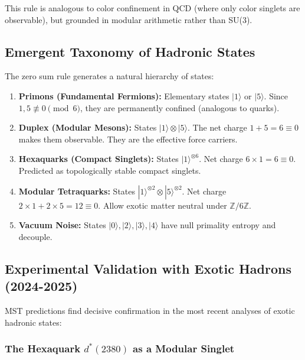\documentclass[11pt, a4paper]{article}
\theoremstyle{plain}
\theoremstyle{definition}
\newcommand{\Zmod}{\mathbb{Z}/6\mathbb{Z}}
\begin{document}
This rule is analogous to color confinement in QCD (where only color singlets are observable), but grounded in modular arithmetic rather than SU(3).

\subsection{Emergent Taxonomy of Hadronic States}

The zero sum rule generates a natural hierarchy of states:

\begin{enumerate}
    \item \textbf{Primons (Fundamental Fermions):} Elementary states $|1\rangle$ or $|5\rangle$. Since $1,5 \not\equiv 0 \pmod{6}$, they are permanently confined (analogous to quarks).
    
    \item \textbf{Duplex (Modular Mesons):} States $|1\rangle \otimes |5\rangle$. The net charge $1+5=6 \equiv 0$ makes them observable. They are the effective force carriers.
    
    \item \textbf{Hexaquarks (Compact Singlets):} States $|1\rangle^{\otimes 6}$. Net charge $6 \times 1 = 6 \equiv 0$. Predicted as topologically stable compact singlets.
    
    \item \textbf{Modular Tetraquarks:} States $|1\rangle^{\otimes 2} \otimes |5\rangle^{\otimes 2}$. Net charge $2\times1 + 2\times5 = 12 \equiv 0$. Allow exotic matter neutral under $\Zmod$.
    
    \item \textbf{Vacuum Noise:} States $|0\rangle, |2\rangle, |3\rangle, |4\rangle$ have null primality entropy and decouple.
\end{enumerate}

\subsection{Experimental Validation with Exotic Hadrons (2024-2025)}

MST predictions find decisive confirmation in the most recent analyses of exotic hadronic states:

\subsubsection{The Hexaquark \texorpdfstring{$d^*(2380)$}{d*(2380)} as a Modular Singlet}
\end{document}
